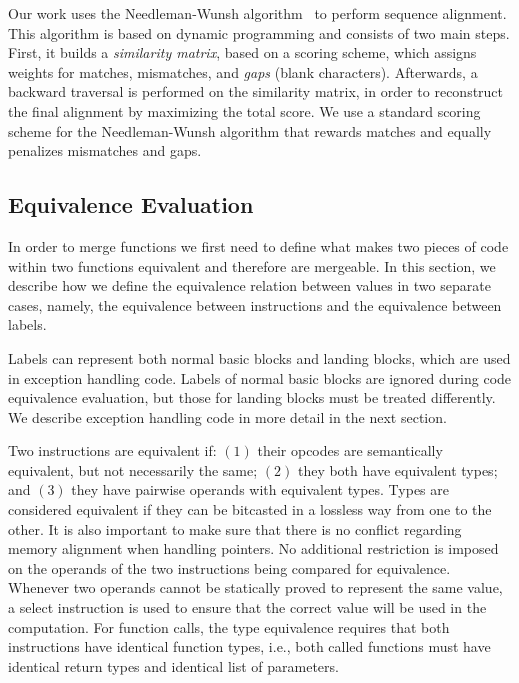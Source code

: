Our work uses the Needleman-Wunsh algorithm~\cite{needleman70} to perform sequence alignment. This algorithm is based on dynamic
programming and consists of two main steps. First, it builds a \textit{similarity matrix}, based on a scoring scheme, which assigns weights
for matches, mismatches, and \textit{gaps} (blank characters). Afterwards, a backward traversal is performed on the similarity matrix, in
order to reconstruct the final alignment by maximizing the total score. We use a standard scoring scheme for the Needleman-Wunsh algorithm
that rewards matches and equally penalizes mismatches and gaps.



\subsection{Equivalence Evaluation}

In order to merge functions we first need to define what makes two pieces of code within two functions equivalent and therefore are
mergeable. In this section, we describe how we define the equivalence relation between values in two separate cases, namely, the
equivalence between instructions and the equivalence between labels.

Labels can represent both normal basic blocks and landing blocks, which are used in exception handling code. Labels of normal basic blocks
are ignored during code equivalence evaluation, but those for landing blocks must be treated differently. We describe exception handling
code in more detail in the next section.

Two instructions are equivalent if: $(1)$ their opcodes are semantically
equivalent, but not necessarily the same; $(2)$ they both have equivalent types;
and $(3)$ they have pairwise operands with equivalent types.
Types are considered equivalent if they can be bitcasted in a lossless way
from one to the other.
It is also important to make sure that there is no conflict regarding memory
alignment when handling pointers.
No additional restriction is imposed on the operands of the two instructions
being compared for equivalence.
Whenever two operands cannot be statically proved to represent the same value,
a select instruction is used to ensure that the correct value will be used in
the computation.
For function calls, the type equivalence requires that both instructions have
identical function types, i.e., both called functions must have identical
return types and identical list of parameters.

